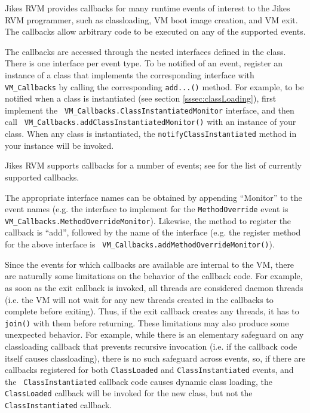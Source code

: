 

Jikes\TM{} RVM provides callbacks for many runtime events of
interest to the Jikes RVM 
programmer, such as classloading, VM boot image creation, and VM exit.  The
callbacks allow arbitrary code to be executed on any of the supported events.

The callbacks are accessed through the nested interfaces defined in the 
class.  There is one interface per event type.  To be notified
of an event, register an instance of a class that implements the corresponding
interface with {\tt VM\_Callbacks} by calling the corresponding {\tt add...()}
method.  For example, to be notified when a class is instantiated (see section
\ref{sssec:classLoading}), first implement the {\tt
VM\_Callbacks.ClassInstantiatedMonitor} interface, and then call {\tt
VM\_Callbacks.addClassInstantiatedMonitor()} with an instance of your class.
When any class is instantiated, the {\tt notifyClassInstantiated} method in
your instance will be invoked.

Jikes RVM supports callbacks for a number of events; see 
 for the list of currently
supported callbacks.

The appropriate interface names can be obtained by appending ``Monitor'' to the
event names (e.g. the interface to implement for the {\tt MethodOverride} event
is {\tt VM\_Callbacks.MethodOverrideMonitor}).  Likewise, the method to
register the callback is ``add'', followed by the name of the interface (e.g.
the register method for the above interface is {\tt
VM\_Callbacks.addMethodOverrideMonitor()}).

Since the events for which callbacks are available are internal to the VM,
there are naturally some limitations on the behavior of the callback code.  For
example, as soon as the exit callback is invoked, all threads are considered
daemon threads (i.e. the VM will not wait for any new threads created in the
callbacks to complete before exiting).  Thus, if the exit callback creates any
threads, it has to {\tt join()} with them before returning.  These limitations
may also produce some unexpected behavior.  For example, while there is an
elementary safeguard on any classloading callback that prevents recursive
invocation (i.e. if the callback code itself causes classloading), there is no
such safeguard across events, so, if there are callbacks registered for both
{\tt ClassLoaded} and {\tt ClassInstantiated} events, and the {\tt
ClassInstantiated} callback code causes dynamic class loading, the {\tt
ClassLoaded} callback will be invoked for the new class, but not the {\tt
ClassInstantiated} callback.

